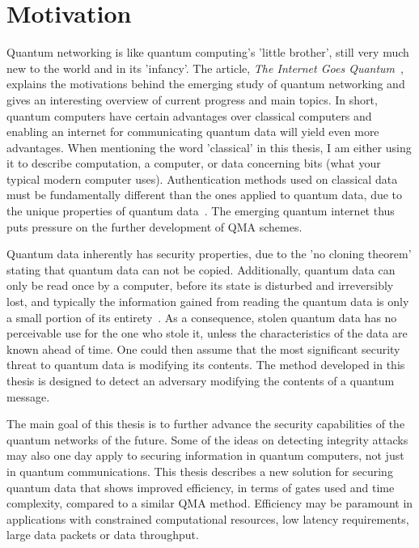 \chapter{Motivation}
\label{sec:Motivation}
Quantum networking is like quantum computing's 'little brother', still very much new to the world and in its 'infancy'. The article, \emph{The Internet Goes Quantum}~\cite{popkin2021internet}, explains the motivations behind the emerging study of quantum networking and gives an interesting overview of current progress and main topics. In short, quantum computers have certain advantages over classical computers and enabling an internet for communicating quantum data will yield even more advantages. When mentioning the word 'classical' in this thesis, I am either using it to describe computation, a computer, or data concerning bits (what your typical modern computer uses). Authentication methods used on classical data must be fundamentally different than the ones applied to quantum data, due to the unique properties of quantum data~\cite{barnum2002authentication}. The emerging quantum internet thus puts pressure on the further development of QMA schemes.

Quantum data inherently has security properties, due to the 'no cloning theorem' stating that quantum data can not be copied. Additionally, quantum data can only be read once by a computer, before its state is disturbed and irreversibly lost, and typically the information gained from reading the quantum data is only a small portion of its entirety~\cite{nielsen2002quantum}. As a consequence, stolen quantum data has no perceivable use for the one who stole it, unless the characteristics of the data are known ahead of time. One could then assume that the most significant security threat to quantum data is modifying its contents. The method developed in this thesis is designed to detect an adversary modifying the contents of a quantum message.

The main goal of this thesis is to further advance the security capabilities of the quantum networks of the future. Some of the ideas on detecting integrity attacks may also one day apply to securing information in quantum computers, not just in quantum communications. This thesis describes a new solution for securing quantum data that shows improved efficiency, in terms of gates used and time complexity, compared to a similar QMA method. Efficiency may be paramount in applications with constrained computational resources, low latency requirements, large data packets or data throughput.


